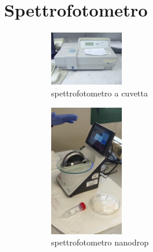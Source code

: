 \documentclass{report}
\begin{document}
	\vspace{0.5cm}


	\section{Spettrofotometro}

	\begin{figure}[H]
		\centering

			\begin{subfigure}[b]{1\textwidth}

				\centering
		  	\includegraphics[width=0.35\textwidth]{./immagini/spettrofotometro.jpg}
				\caption{spettrofotometro a cuvetta}
				\label{spettrofotometro_cuvetta}

			\end{subfigure}

			\qquad

			\begin{subfigure}[b]{1\textwidth}
				\centering
				\includegraphics[width=0.35\textwidth]{./immagini/spettrofotometro_nanodrop.jpg}
				\caption{spettrofotometro nanodrop}
				\label{spettrofotometro_nanodrop}
			\end{subfigure}

			\quad

			\begin{subfigure}[b]{1\textwidth}


\end{subfigure}
\end{figure}
\end{document}
